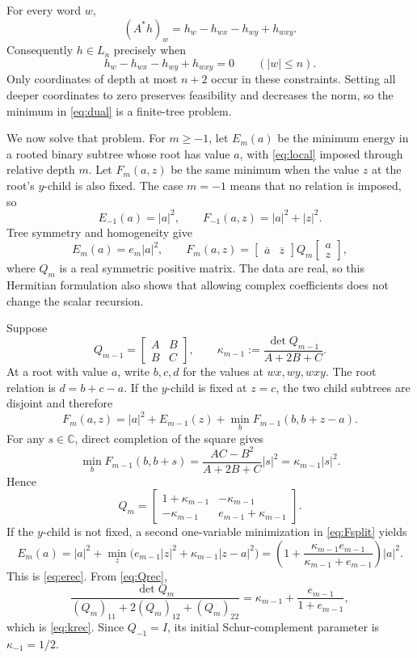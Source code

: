 \documentclass[11pt]{article}
\begin{document}
For every word $w$,
\[
 (A^*h)_w=h_w-h_{wx}-h_{wy}+h_{wxy}.
\]
Consequently $h\in L_n$ precisely when
\begin{equation}\label{eq:local}
 h_w-h_{wx}-h_{wy}+h_{wxy}=0
 \qquad (|w|\le n).
\end{equation}
Only coordinates of depth at most $n+2$ occur in these constraints.  Setting
all deeper coordinates to zero preserves feasibility and decreases the norm,
so the minimum in \eqref{eq:dual} is a finite-tree problem.

We now solve that problem.  For $m\ge-1$, let $E_m(a)$ be the minimum energy
in a rooted binary subtree whose root has value $a$, with
\eqref{eq:local} imposed through relative depth $m$.  Let $F_m(a,z)$ be the
same minimum when the value $z$ at the root's $y$-child is also fixed.  The
case $m=-1$ means that no relation is imposed, so
\[
 E_{-1}(a)=|a|^2,
 \qquad F_{-1}(a,z)=|a|^2+|z|^2.
\]
Tree symmetry and homogeneity give
\[
 E_m(a)=e_m|a|^2,
 \qquad
 F_m(a,z)=
 \begin{bmatrix}\overline a&\overline z\end{bmatrix}
 Q_m
 \begin{bmatrix}a\\z\end{bmatrix},
\]
where $Q_m$ is a real symmetric positive matrix.  The data are real, so this
Hermitian formulation also shows that allowing complex coefficients does not
change the scalar recursion.

Suppose
\[
 Q_{m-1}=\begin{bmatrix}A&B\\B&C\end{bmatrix},
 \qquad
 \kappa_{m-1}:=
 \frac{\det Q_{m-1}}{A+2B+C}.
\]
At a root with value $a$, write $b,c,d$ for the values at $wx,wy,wxy$.
The root relation is $d=b+c-a$.  If the $y$-child is fixed at $z=c$, the
two child subtrees are disjoint and therefore
\begin{equation}\label{eq:Fsplit}
 F_m(a,z)=|a|^2+E_{m-1}(z)
 +\min_b F_{m-1}(b,b+z-a).
\end{equation}
For any $s\in\mathbb C$, direct completion of the square gives
\[
 \min_b F_{m-1}(b,b+s)
 =\frac{AC-B^2}{A+2B+C}|s|^2
 =\kappa_{m-1}|s|^2.
\]
Hence
\begin{equation}\label{eq:Qrec}
 Q_m=
 \begin{bmatrix}
 1+\kappa_{m-1}&-\kappa_{m-1}\\
 -\kappa_{m-1}&e_{m-1}+\kappa_{m-1}
 \end{bmatrix}.
\end{equation}
If the $y$-child is not fixed, a second one-variable minimization in
\eqref{eq:Fsplit} yields
\[
 E_m(a)
 =|a|^2+\min_z\bigl(e_{m-1}|z|^2
 +\kappa_{m-1}|z-a|^2\bigr)
 =\left(1+\frac{\kappa_{m-1}e_{m-1}}
 {\kappa_{m-1}+e_{m-1}}\right)|a|^2.
\]
This is \eqref{eq:erec}.  From \eqref{eq:Qrec},
\[
 \frac{\det Q_m}{(Q_m)_{11}+2(Q_m)_{12}+(Q_m)_{22}}
 =\kappa_{m-1}+\frac{e_{m-1}}{1+e_{m-1}},
\]
which is \eqref{eq:krec}.  Since $Q_{-1}=I$, its initial Schur-complement
parameter is $\kappa_{-1}=1/2$.
\end{document}
